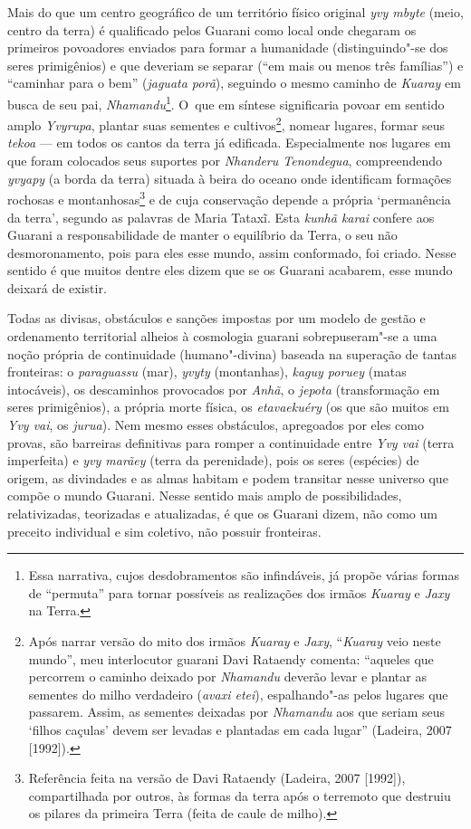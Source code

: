 Mais do que um centro geográfico de um território físico original \emph{yvy
mbyte} (meio, centro da terra) é qualificado pelos Guarani como local
onde chegaram os primeiros povoadores enviados para formar a humanidade
(distinguindo"-se dos seres primigênios) e que deveriam se separar (``em
mais ou menos três famílias'') e ``caminhar para o bem'' (\emph{jaguata porã}),
seguindo o mesmo caminho de \emph{Kuaray} em busca de seu pai,
\emph{Nhamandu}\footnote{Essa narrativa, cujos desdobramentos são infindáveis,
já propõe várias formas de ``permuta'' para tornar possíveis as
realizações dos irmãos \emph{Kuaray} e \emph{Jaxy} na Terra.}. O~que em síntese
significaria povoar em sentido amplo \emph{Yvyrupa}, plantar suas sementes e
cultivos\footnote{Após narrar versão do mito dos irmãos \emph{Kuaray} e \emph{Jaxy},
``\emph{Kuaray} veio neste mundo'', meu interlocutor guarani Davi Rataendy
comenta: ``aqueles que percorrem o caminho deixado por \emph{Nhamandu} deverão
levar e plantar as sementes do milho verdadeiro (\emph{avaxi etei}),
espalhando"-as pelos lugares que passarem. Assim, as sementes deixadas
por \emph{Nhamandu} aos que seriam seus ‘filhos caçulas’ devem ser levadas e
plantadas em cada lugar'' (Ladeira, 2007 [1992]).}, nomear lugares,
formar seus \emph{tekoa} --- em todos os cantos da terra já edificada.
Especialmente nos lugares em que foram colocados seus suportes por
\emph{Nhanderu Tenondegua}, compreendendo \emph{yvyapy} (a borda da terra) situada à
beira do oceano onde identificam formações rochosas e
montanhosas\footnote{Referência feita na versão de Davi Rataendy
(Ladeira, 2007 [1992]), compartilhada por outros, às formas da terra
após o terremoto que destruiu os pilares da primeira Terra (feita de
caule de milho). } e de cuja conservação depende a própria ‘permanência
da terra’, segundo as palavras de Maria Tataxĩ.
Esta \emph{kunhã karai} confere aos Guarani a responsabilidade de manter o
equilíbrio da Terra, o seu não desmoronamento, pois para eles esse
mundo, assim conformado, foi criado. Nesse sentido é que muitos dentre
eles dizem que se os Guarani acabarem, esse mundo deixará de existir. 

Todas as divisas, obstáculos e sanções impostas por um modelo de gestão
e ordenamento territorial alheios à cosmologia guarani sobrepuseram"-se
a uma noção própria de continuidade (humano"-divina) baseada na superação
de tantas fronteiras: o \emph{paraguassu} (mar), \emph{yvyty} (montanhas), \emph{kaguy
poruey} (matas intocáveis), os descaminhos provocados por \emph{Anhã}, o \emph{jepota}
(transformação em seres primigênios), a própria morte física, os
\emph{etavaekuéry} (os que são muitos em \emph{Yvy vai}, os \emph{jurua}). Nem mesmo esses
obstáculos, apregoados por eles como provas, são barreiras definitivas
para romper a continuidade entre \emph{Yvy vai} (terra imperfeita) e \emph{yvy
marãey} (terra da perenidade), pois os seres (espécies) de origem, as
divindades e as almas habitam e podem transitar nesse universo que
compõe o mundo Guarani. Nesse sentido mais amplo de possibilidades,
relativizadas, teorizadas e atualizadas, é que os Guarani dizem, não
como um preceito individual e sim coletivo, não possuir fronteiras. 

